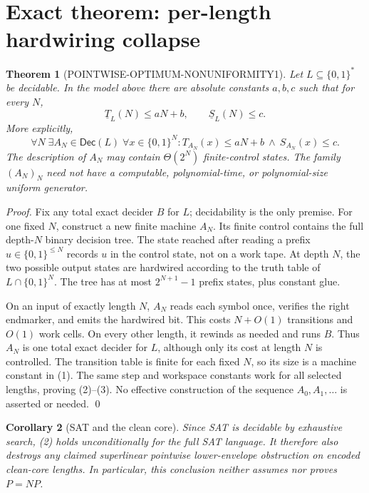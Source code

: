 \documentclass[11pt]{article}
\newtheorem{theorem}{Theorem}
\newtheorem{corollary}[theorem]{Corollary}
\newcommand{\Dec}{\mathsf{Dec}}
\begin{document}
\section{Exact theorem: per-length hardwiring collapse}

\begin{theorem}[POINTWISE-OPTIMUM-NONUNIFORMITY1]
Let \(L\subseteq\{0,1\}^*\) be decidable.  In the model above there are
absolute constants \(a,b,c\) such that for every \(N\),
\[
 \underline T_L(N)\le aN+b,\qquad
 \underline S_L(N)\le c.
 \tag{2}
\]
More explicitly,
\[
 \forall N\;\exists A_N\in\Dec(L)\;\forall x\in\{0,1\}^N:
 T_{A_N}(x)\le aN+b\ \land\ S_{A_N}(x)\le c.
 \tag{3}
\]
The description of \(A_N\) may contain \(\Theta(2^N)\) finite-control states.
The family \((A_N)_N\) need not have a computable, polynomial-time, or
polynomial-size uniform generator.
\end{theorem}

\begin{proof}
Fix any total exact decider \(B\) for \(L\); decidability is the only premise.
For one fixed \(N\), construct a new finite machine \(A_N\).  Its finite
control contains the full depth-\(N\) binary decision tree.  The state reached
after reading a prefix \(u\in\{0,1\}^{\le N}\) records \(u\) in the control
state, not on a work tape.  At depth \(N\), the two possible output states are
hardwired according to the truth table of \(L\cap\{0,1\}^N\).  The tree has
at most \(2^{N+1}-1\) prefix states, plus constant glue.

On an input of exactly length \(N\), \(A_N\) reads each symbol once, verifies
the right endmarker, and emits the hardwired bit.  This costs \(N+O(1)\)
transitions and \(O(1)\) work cells.  On every other length, it rewinds as
needed and runs \(B\).  Thus \(A_N\) is one total exact decider for \(L\),
although only its cost at length \(N\) is controlled.  The transition table
is finite for each fixed \(N\), so its size is a machine constant in (1).
The same step and workspace constants work for all selected lengths, proving
(2)--(3).  No effective construction of the sequence \(A_0,A_1,\ldots\) is
asserted or needed.  \qed
\end{proof}

\begin{corollary}[SAT and the clean core]
Since SAT is decidable by exhaustive search, (2) holds unconditionally for
the full SAT language.  It therefore also destroys any claimed superlinear
pointwise lower-envelope obstruction on encoded clean-core lengths.  In
particular, this conclusion neither assumes nor proves \(P=NP\).
\end{corollary}
\end{document}
